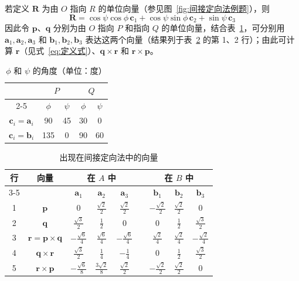 \begin{solution}
若定义 $\mathbf{R}$ 为由 $O$ 指向 $R$ 的单位向量（参见图~\eqref{fig:间接定向法例题}），则
$$
\mathbf{R}=\cos\psi\cos\phi\,\mathbf{c}_1+\cos\psi\sin\phi\,\mathbf{c}_2+\sin\psi\,\mathbf{c}_3
$$
因此令 $\mathbf{p}$、$\mathbf{q}$ 分别为由 $O$ 指向 $P$ 和指向 $Q$ 的单位向量，结合表~\ref{tab:1.5.1}，可分别用 $\mathbf{a}_1,\mathbf{a}_2,\mathbf{a}_3$ 和 $\mathbf{b}_1,\mathbf{b}_2,\mathbf{b}_3$ 表达这两个向量（结果列于表~\ref{tab:1.5.2} 的第 1、2 行）；由此可计算 $\mathbf{r}$（见式~\eqref{eq:定义式}）、$\mathbf{q}\times\mathbf{r}$ 和 $\mathbf{r}\times\mathbf{p}$。

\begin{table}[H]
\centering
\caption{$\phi$ 和 $\psi$ 的角度（单位：度）}
\label{tab:1.5.1}
\begin{tabular}{|c|cc|cc|}
\hline
 & \multicolumn{2}{c|}{$P$} & \multicolumn{2}{c|}{$Q$} \\
\cline{2-5}
 & $\phi$ & $\psi$ & $\phi$ & $\psi$ \\
\hline
$\mathbf{c}_i = \mathbf{a}_i$ & 90 & 45 & 30  & 0  \\
$\mathbf{c}_i = \mathbf{b}_i$ & 135 & 0  & 90  & 60 \\
\hline
\end{tabular}
\end{table}

\begin{table}[H]
\centering
\caption{出现在间接定向法中的向量}
\label{tab:1.5.2}
\begin{tabular}{|c|c|c|c|c|c|c|c|c|}
\hline
\multirow{2}{*}{行} & \multirow{2}{*}{向量} & \multicolumn{3}{c|}{在 $A$ 中} & & \multicolumn{3}{c|}{在 $B$ 中} \\
\cline{3-5}\cline{7-9}
 & & $\mathbf{a}_1$ & $\mathbf{a}_2$ & $\mathbf{a}_3$ & & $\mathbf{b}_1$ & $\mathbf{b}_2$ & $\mathbf{b}_3$ \\
\hline
1 & $\mathbf{p}$ & $0$ & $\frac{\sqrt{2}}{2}$ & $\frac{\sqrt{2}}{2}$ & & $-\frac{\sqrt{2}}{2}$ & $\frac{\sqrt{2}}{2}$ & $0$ \\
2 & $\mathbf{q}$ & $\frac{\sqrt{3}}{2}$ & $\frac{1}{2}$ & $0$ & & $0$ & $\frac{1}{2}$ & $\frac{\sqrt{3}}{2}$ \\
3 & $\mathbf{r}=\mathbf{p}\times\mathbf{q}$ & $-\frac{\sqrt{6}}{4}$ & $\frac{\sqrt{6}}{4}$ & $-\frac{\sqrt{6}}{4}$ & & $\frac{\sqrt{2}}{4}$ & $\frac{\sqrt{2}}{4}$ & $-\frac{\sqrt{2}}{4}$ \\
4 & $\mathbf{q}\times\mathbf{r}$ & $\frac{\sqrt{3}}{2}$ & $\frac{1}{4}$ & $-\frac{1}{4}$ & & $0$ & $\frac{1}{2}$ & $\frac{\sqrt{3}}{2}$ \\
5 & $\mathbf{r}\times\mathbf{p}$ & $-\frac{\sqrt{6}}{8}$ & $\frac{3\sqrt{2}}{8}$ & $\frac{\sqrt{2}}{2}$ & & $-\frac{\sqrt{2}}{2}$ & $\frac{\sqrt{2}}{2}$ & $0$ \\
\hline
\end{tabular}
\end{table}


\end{solution}
